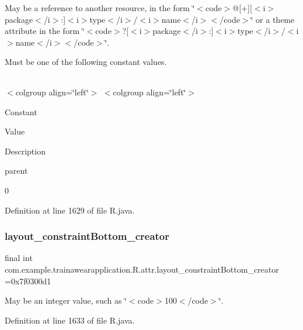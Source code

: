 May be a reference to another resource, in the form \char`\"{}$<$code$>$@\mbox{[}+\mbox{]}\mbox{[}$<$i$>$package$<$/i$>$\+:\mbox{]}$<$i$>$type$<$/i$>$/$<$i$>$name$<$/i$>$$<$/code$>$\char`\"{} or a theme attribute in the form \char`\"{}$<$code$>$?\mbox{[}$<$i$>$package$<$/i$>$\+:\mbox{]}$<$i$>$type$<$/i$>$/$<$i$>$name$<$/i$>$$<$/code$>$\char`\"{}. 

Must be one of the following constant values.

\tabulinesep=1mm
\begin{longtabu}spread 0pt [c]{*{0}{|X[-1]}|}
\hline
\end{longtabu}
$<$colgroup align=\char`\"{}left\char`\"{}$>$ $<$colgroup align=\char`\"{}left\char`\"{}$>$ 

Constant

Value

Description 

parent

0

Definition at line 1629 of file R.\+java.

\mbox{\label{classcom_1_1example_1_1trainawearapplication_1_1_r_1_1attr_afb806df9fd600be2881204f4ab00a738}} 
\subsubsection{\texorpdfstring{layout\_constraintBottom\_creator}{layout\_constraintBottom\_creator}}
{\footnotesize\ttfamily final int com.\+example.\+trainawearapplication.\+R.\+attr.\+layout\+\_\+constraint\+Bottom\+\_\+creator =0x7f0300d1\hspace{0.3cm}{\ttfamily [static]}}

May be an integer value, such as \char`\"{}$<$code$>$100$<$/code$>$\char`\"{}. 

Definition at line 1633 of file R.\+java.

\mbox{\label{classcom_1_1example_1_1trainawearapplication_1_1_r_1_1attr_a29b03d28b0999b2dfa6c564767b0dd70}} 
